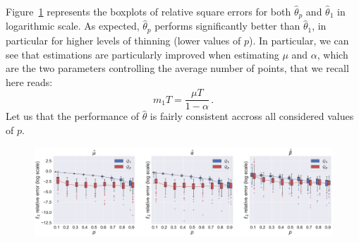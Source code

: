     Figure~\ref{fig:chap5_l2_error_same_information} represents the boxplots of relative square errors for both $\hat \theta_p$ and $\hat \theta_1$ in logarithmic scale.
    As expected, $\hat \theta_p$ performs significantly better than $\hat \theta_1$, 
    in particular for higher levels of thinning (lower values of $p$).
    In particular, we can see that estimations are particularly improved when estimating $\mu$ and $\alpha$,
    which are the two parameters controlling the average number of points, that we recall here reads:
    \[m_1 T = \frac{\mu T}{1-\alpha}\,.\]
    Let us that the performance of $\hat \theta$ is fairly consistent accross all considered values of $p$.

    \begin{figure}[!ht]
        \centering
        \includegraphics[width=1.0\textwidth]{images/chapter5/l2_error_same_information.pdf} 
        \caption{
        }
        \label{fig:chap5_l2_error_same_information}
      \end{figure}




